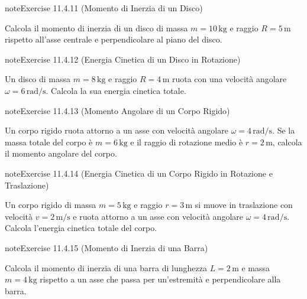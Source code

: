 \documentclass[letterpaper,10pt,italian]{jupyterBook}
\begin{document}
\begin{sphinxadmonition}{note}{Exercise 11.4.11 (Momento di Inerzia di un Disco)}



\sphinxAtStartPar
Calcola il momento di inerzia di un disco di massa \(m = 10 \, \text{kg}\) e raggio \(R = 5 \, \text{m}\) rispetto all’asse centrale e perpendicolare al piano del disco.
\end{sphinxadmonition}
 \label{exercise:ch/mechanics/inertia-problems-exercise-11}

\begin{sphinxadmonition}{note}{Exercise 11.4.12 (Energia Cinetica di un Disco in Rotazione)}



\sphinxAtStartPar
Un disco di massa \(m = 8 \, \text{kg}\) e raggio \(R = 4 \, \text{m}\) ruota con una velocità angolare \(\omega = 6 \, \text{rad/s}\). Calcola la sua energia cinetica totale.
\end{sphinxadmonition}
 \label{exercise:ch/mechanics/inertia-problems-exercise-12}

\begin{sphinxadmonition}{note}{Exercise 11.4.13 (Momento Angolare di un Corpo Rigido)}



\sphinxAtStartPar
Un corpo rigido ruota attorno a un asse con velocità angolare \(\omega = 4 \, \text{rad/s}\). Se la massa totale del corpo è \(m = 6 \, \text{kg}\) e il raggio di rotazione medio è \(r = 2 \, \text{m}\), calcola il momento angolare del corpo.
\end{sphinxadmonition}
 \label{exercise:ch/mechanics/inertia-problems-exercise-13}

\begin{sphinxadmonition}{note}{Exercise 11.4.14 (Energia Cinetica di un Corpo Rigido in Rotazione e Traslazione)}



\sphinxAtStartPar
Un corpo rigido di massa \(m = 5 \, \text{kg}\) e raggio \(r = 3 \, \text{m}\) si muove in traslazione con velocità \(v = 2 \, \text{m/s}\) e ruota attorno a un asse con velocità angolare \(\omega = 4 \, \text{rad/s}\). Calcola l’energia cinetica totale del corpo.
\end{sphinxadmonition}
 \label{exercise:ch/mechanics/inertia-problems-exercise-14}

\begin{sphinxadmonition}{note}{Exercise 11.4.15 (Momento di Inerzia di una Barra)}



\sphinxAtStartPar
Calcola il momento di inerzia di una barra di lunghezza \(L = 2 \, \text{m}\) e massa \(m = 4 \, \text{kg}\) rispetto a un asse che passa per un’estremità e perpendicolare alla barra.
\end{sphinxadmonition}
 \label{exercise:ch/mechanics/inertia-problems-exercise-15}
\end{document}
